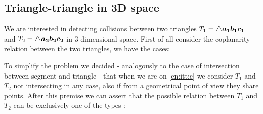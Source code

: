 \documentclass[dissertation.tex]{subfiles}
\begin{document}
\subsection{Triangle-triangle in 3D space}\label{sec:intersectionsTriangleTriangle}
We are interested in detecting collisions between two triangles
$T_1=\triangle \boldsymbol{a_1}\boldsymbol{b_1}\boldsymbol{c_1}$ and $T_2=\triangle\boldsymbol{a_2}\boldsymbol{b_2}\boldsymbol{c_2}$ in 3-dimensional
space. First of all consider the coplanarity relation between the two
triangles, we have the cases:
To simplify the problem we decided - analogously to the case of
intersection between segment and triangle - that when we are on \cref{en:itt:c}
we consider $T_1$ and $T_2$ not intersecting in any case, also if from a
geometrical point of view they share points. After this premise we can
assert that the possible relation between $T_1$ and $T_2$ can be
exclusively one
of the types \cite{schneider}:
\end{document}
